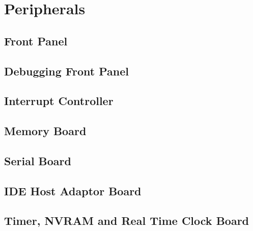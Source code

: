 \ifdefined\renderpartperipherals
\part{Peripherals}
  \ifdefined\renderchappfp
    \chapter{Front Panel}
    \glsresetall
    
  \fi

  \ifdefined\renderchapmbu
    \glsresetall
  \fi

  \ifdefined\renderchapdfp
    \chapter{Debugging Front Panel}
    \glsresetall
    
  \fi

  \ifdefined\renderchapirc
    \chapter{Interrupt Controller}
    \glsresetall
    
  \fi

  \ifdefined\renderchapmem
    \chapter{Memory Board}
    \glsresetall
    
  \fi

  \ifdefined\renderchaptty
    \chapter{Serial Board}
    \glsresetall
  \fi

  \ifdefined\renderchapide
    \chapter{IDE Host Adaptor Board}
    \glsresetall
  \fi

  \ifdefined\renderchaptnr
    \chapter{Timer, NVRAM and Real Time Clock Board}
    \glsresetall
  \fi

